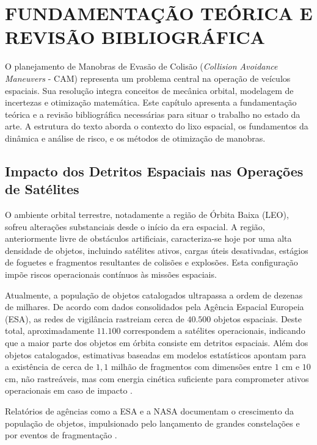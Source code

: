 \chapter{FUNDAMENTAÇÃO TEÓRICA E REVISÃO BIBLIOGRÁFICA}
\label{chap:fundamentacao_teorica}

O planejamento de Manobras de Evasão de Colisão (\textit{Collision Avoidance Maneuvers} - CAM) representa um problema central na operação de veículos espaciais. Sua resolução integra conceitos de mecânica orbital, modelagem de incertezas e otimização matemática. Este capítulo apresenta a fundamentação teórica e a revisão bibliográfica necessárias para situar o trabalho no estado da arte. A estrutura do texto aborda o contexto do lixo espacial, os fundamentos da dinâmica e análise de risco, e os métodos de otimização de manobras.

\section{Impacto dos Detritos Espaciais nas Operações de Satélites}
\label{sec:ambiente_lixo_espacial}

O ambiente orbital terrestre, notadamente a região de Órbita Baixa (LEO), sofreu alterações substanciais desde o início da era espacial. A região, anteriormente livre de obstáculos artificiais, caracteriza-se hoje por uma alta densidade de objetos, incluindo satélites ativos, cargas úteis desativadas, estágios de foguetes e fragmentos resultantes de colisões e explosões. Esta configuração impõe riscos operacionais contínuos às missões espaciais.

Atualmente, a população de objetos catalogados ultrapassa a ordem de dezenas de milhares. De acordo com dados consolidados pela Agência Espacial Europeia (ESA), as redes de vigilância rastreiam cerca de $40.500$ objetos espaciais. Deste total, aproximadamente $11.100$ correspondem a satélites operacionais, indicando que a maior parte dos objetos em órbita consiste em detritos espaciais. Além dos objetos catalogados, estimativas baseadas em modelos estatísticos apontam para a existência de cerca de $1,1$ milhão de fragmentos com dimensões entre $1$ cm e $10$ cm, não rastreáveis, mas com energia cinética suficiente para comprometer ativos operacionais em caso de impacto \cite{ESA_EnvReport2025}.

Relatórios de agências como a ESA e a NASA documentam o crescimento da população de objetos, impulsionado pelo lançamento de grandes constelações e por eventos de fragmentação \cite{NASA_ODQN_2024}.

